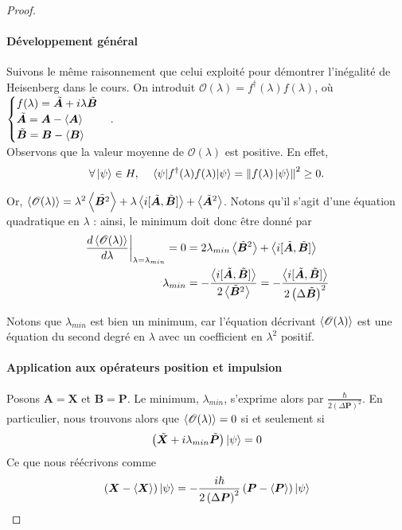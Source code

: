 \documentclass[11pt,oneside,a4paper]{article}
\newcommand{\h}{\ensuremath{\hbar}}
\newcommand\au[2]{\left.#1\right|_{#2}}
\begin{document}
\begin{proof}
\paragraph{Développement général}
Suivons le même raisonnement que celui exploité pour démontrer l'inégalité de Heisenberg dans le cours. On introduit $\mathcal{O}(\lambda) = f^\dagger(\lambda)f(\lambda)$, où $\begin{cases}
  f(\lambda) = \tilde{\bm{A}}+i\lambda\tilde{\bm{B}}\\
  \tilde{\bm{A}} = \bm{A}-\expval{\bm{A}}\\
  \tilde{\bm{B}} = \bm{B}-\expval{\bm{B}}
\end{cases}$.\\

Observons que la valeur moyenne de $\mathcal{O}(\lambda)$ est positive. En effet,
\begin{equation*}
  \forall\ket{\psi}\in H, \quad \expval{f^\dagger(\lambda)f(\lambda)}{\psi} = \norm{f(\lambda)\ket{\psi}}^2 \geq 0.
\end{equation*}

Or, $\expval{\mathcal{O}(\lambda)} = \lambda^2\expval{\tilde{\bm{B}^2}}+\lambda\expval{i[\tilde{\bm{A}},\tilde{\bm{B}}]}+\expval{\tilde{\bm{A}}^2}$. Notons qu'il s'agit d'une équation quadratique en $\lambda$ : ainsi, le minimum doit donc être donné par 
\begin{align}
  \au{\frac{d\expval{\mathcal{O}(\lambda)}}{d\lambda}}{\lambda=\lambda_{min}} = 0 &= 2\lambda_{min}\expval{\tilde{\bm{B}}^2}+\expval{i[\tilde{\bm{A}},\tilde{\bm{B}}]}\notag\\
  \lambda_{min} &= -\frac{\expval{i[\tilde{\bm{A}},\tilde{\bm{B}}]}}{2\expval{\tilde{\bm{B}}^2}} = -\frac{\expval{i[\tilde{\bm{A}},\tilde{\bm{B}}]}}{2\left(\Delta \tilde{\bm{B}}\right)^2}
\end{align}

Notons que $\lambda_{min}$ est bien un minimum, car l'équation décrivant $\expval{\mathcal{O}(\lambda)}$ est une équation du second degré en $\lambda$ avec un coefficient en $\lambda^2$ positif.

\paragraph{Application aux opérateurs position et impulsion}
Posons $\bm{A} = \bm{X}$ et $\bm{B} = \bm{P}$. Le minimum, $\lambda_{min}$, s'exprime alors par $\frac{\h}{2\left(\Delta \bm{P}\right)^2}$. En particulier, nous trouvons alors que $\expval{\mathcal{O}(\lambda)} = 0$ si et seulement si 
\begin{align}
  \left(\tilde{\bm{X}}+i\lambda_{min}\tilde{\bm{P}}\right)\ket{\psi} = 0\notag
\end{align}
Ce que nous réécrivons comme
\begin{align}
  \left(\bm{X}-\expval{\bm{X}}\right)\ket{\psi} = -\frac{i\h}{2\left(\Delta \bm{P}\right)^2}\left(\bm{P}-\expval{\bm{P}}\right)\ket{\psi}\label{1.5}
\end{align}


\end{proof}
\end{document}
